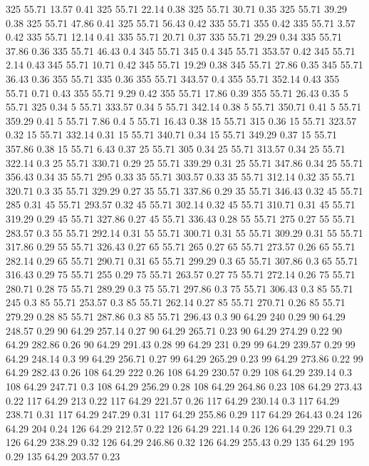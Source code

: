 325	55.71	13.57	0.41
325	55.71	22.14	0.38
325	55.71	30.71	0.35
325	55.71	39.29	0.38
325	55.71	47.86	0.41
325	55.71	56.43	0.42
335	55.71	355	0.42
335	55.71	3.57	0.42
335	55.71	12.14	0.41
335	55.71	20.71	0.37
335	55.71	29.29	0.34
335	55.71	37.86	0.36
335	55.71	46.43	0.4
345	55.71	345	0.4
345	55.71	353.57	0.42
345	55.71	2.14	0.43
345	55.71	10.71	0.42
345	55.71	19.29	0.38
345	55.71	27.86	0.35
345	55.71	36.43	0.36
355	55.71	335	0.36
355	55.71	343.57	0.4
355	55.71	352.14	0.43
355	55.71	0.71	0.43
355	55.71	9.29	0.42
355	55.71	17.86	0.39
355	55.71	26.43	0.35
5	55.71	325	0.34
5	55.71	333.57	0.34
5	55.71	342.14	0.38
5	55.71	350.71	0.41
5	55.71	359.29	0.41
5	55.71	7.86	0.4
5	55.71	16.43	0.38
15	55.71	315	0.36
15	55.71	323.57	0.32
15	55.71	332.14	0.31
15	55.71	340.71	0.34
15	55.71	349.29	0.37
15	55.71	357.86	0.38
15	55.71	6.43	0.37
25	55.71	305	0.34
25	55.71	313.57	0.34
25	55.71	322.14	0.3
25	55.71	330.71	0.29
25	55.71	339.29	0.31
25	55.71	347.86	0.34
25	55.71	356.43	0.34
35	55.71	295	0.33
35	55.71	303.57	0.33
35	55.71	312.14	0.32
35	55.71	320.71	0.3
35	55.71	329.29	0.27
35	55.71	337.86	0.29
35	55.71	346.43	0.32
45	55.71	285	0.31
45	55.71	293.57	0.32
45	55.71	302.14	0.32
45	55.71	310.71	0.31
45	55.71	319.29	0.29
45	55.71	327.86	0.27
45	55.71	336.43	0.28
55	55.71	275	0.27
55	55.71	283.57	0.3
55	55.71	292.14	0.31
55	55.71	300.71	0.31
55	55.71	309.29	0.31
55	55.71	317.86	0.29
55	55.71	326.43	0.27
65	55.71	265	0.27
65	55.71	273.57	0.26
65	55.71	282.14	0.29
65	55.71	290.71	0.31
65	55.71	299.29	0.3
65	55.71	307.86	0.3
65	55.71	316.43	0.29
75	55.71	255	0.29
75	55.71	263.57	0.27
75	55.71	272.14	0.26
75	55.71	280.71	0.28
75	55.71	289.29	0.3
75	55.71	297.86	0.3
75	55.71	306.43	0.3
85	55.71	245	0.3
85	55.71	253.57	0.3
85	55.71	262.14	0.27
85	55.71	270.71	0.26
85	55.71	279.29	0.28
85	55.71	287.86	0.3
85	55.71	296.43	0.3
90	64.29	240	0.29
90	64.29	248.57	0.29
90	64.29	257.14	0.27
90	64.29	265.71	0.23
90	64.29	274.29	0.22
90	64.29	282.86	0.26
90	64.29	291.43	0.28
99	64.29	231	0.29
99	64.29	239.57	0.29
99	64.29	248.14	0.3
99	64.29	256.71	0.27
99	64.29	265.29	0.23
99	64.29	273.86	0.22
99	64.29	282.43	0.26
108	64.29	222	0.26
108	64.29	230.57	0.29
108	64.29	239.14	0.3
108	64.29	247.71	0.3
108	64.29	256.29	0.28
108	64.29	264.86	0.23
108	64.29	273.43	0.22
117	64.29	213	0.22
117	64.29	221.57	0.26
117	64.29	230.14	0.3
117	64.29	238.71	0.31
117	64.29	247.29	0.31
117	64.29	255.86	0.29
117	64.29	264.43	0.24
126	64.29	204	0.24
126	64.29	212.57	0.22
126	64.29	221.14	0.26
126	64.29	229.71	0.3
126	64.29	238.29	0.32
126	64.29	246.86	0.32
126	64.29	255.43	0.29
135	64.29	195	0.29
135	64.29	203.57	0.23
